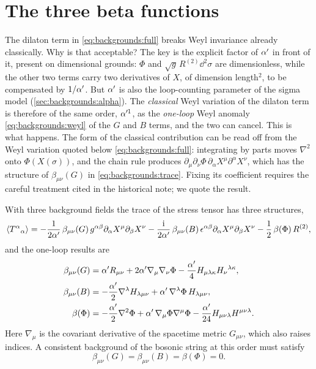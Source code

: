 \section{The three beta functions}\label{sec:backgrounds:beta}

The dilaton term in \eqref{eq:backgrounds:full} breaks Weyl invariance already classically.
Why is that acceptable? The key is the explicit factor of $\alpha'$ in front of it, present on
dimensional grounds: $\Phi$ and $\sqrt g\,R^{(2)}\dd^2\sigma$ are dimensionless, while the other
two terms carry two derivatives of $X$, of dimension length$^2$, to be compensated by
$1/\alpha'$. But $\alpha'$ is also the loop-counting parameter of the sigma model
(\cref{sec:backgrounds:alpha}). The \emph{classical} Weyl variation of the dilaton term is
therefore of the same order, $\alpha'^1$, as the \emph{one-loop} Weyl anomaly
\eqref{eq:backgrounds:weyl} of the $G$ and $B$ terms, and the two can cancel.
 This is what happens. The form of the
classical contribution can be read off from the Weyl variation quoted below
\eqref{eq:backgrounds:full}: integrating by parts moves $\nabla^2$ onto $\Phi(X(\sigma))$,
and the chain rule produces
$\partial_\mu\partial_\nu\Phi\,\partial_\alpha X^\mu\partial^\alpha X^\nu$, which has the
structure of $\beta_{\mu\nu}(G)$ in \eqref{eq:backgrounds:trace}. Fixing its coefficient
requires the careful treatment cited in the historical note; we quote the result.

With three background fields the trace of the stress tensor has three structures,
\begin{equation}\label{eq:backgrounds:threetrace}
  \langle T^\alpha{}_\alpha\rangle=-\frac{1}{2\alpha'}\,\beta_{\mu\nu}(G)\,g^{\alpha\beta}
  \partial_\alpha X^\mu\partial_\beta X^\nu
  -\frac{\mathrm{i}}{2\alpha'}\,\beta_{\mu\nu}(B)\,\epsilon^{\alpha\beta}
  \partial_\alpha X^\mu\partial_\beta X^\nu-\frac12\,\beta(\Phi)\,R^{(2)},
\end{equation}
 and the one-loop results are
\begin{align}
  \beta_{\mu\nu}(G)&=\alpha' R_{\mu\nu}+2\alpha'\nabla_\mu\nabla_\nu\Phi
     -\frac{\alpha'}{4}H_{\mu\lambda\kappa}H_\nu{}^{\lambda\kappa},\label{eq:backgrounds:betaG}\\
  \beta_{\mu\nu}(B)&=-\frac{\alpha'}{2}\nabla^\lambda H_{\lambda\mu\nu}
     +\alpha'\,\nabla^\lambda\Phi\,H_{\lambda\mu\nu},\label{eq:backgrounds:betaB}\\
  \beta(\Phi)&=-\frac{\alpha'}{2}\nabla^2\Phi+\alpha'\,\nabla_\mu\Phi\nabla^\mu\Phi
     -\frac{\alpha'}{24}H_{\mu\nu\lambda}H^{\mu\nu\lambda}.\label{eq:backgrounds:betaPhi}
\end{align}
 Here $\nabla_\mu$ is the covariant derivative of the
spacetime metric $G_{\mu\nu}$, which also raises indices. A consistent background of the
bosonic string at this order must satisfy \TL
\begin{equation}\label{eq:backgrounds:allzero}
  \beta_{\mu\nu}(G)=\beta_{\mu\nu}(B)=\beta(\Phi)=0 .
\end{equation}

